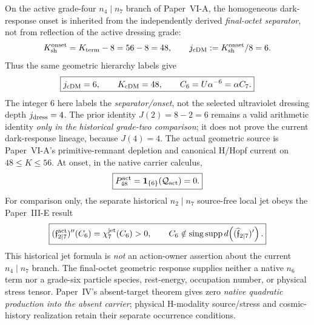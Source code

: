 \documentclass[12pt,a4paper]{article}
\begin{document}
\begin{theorem}[Final-octet \(K=48\) onset and native-carrier desert]
\label{p9:thm:closed-j48-scalaron-abundance-trace}
On the active grade-four \(n_4\mid n_7\) branch of Paper~VI-A, the
homogeneous dark-response onset is inherited from the independently derived
\emph{final-octet separator}, not from reflection of the active dressing grade:
\[
 K_{\rm sh}^{\rm onset}=K_{\rm term}-8=56-8=48,
 \qquad j_{\rm cDM}:=K_{\rm sh}^{\rm onset}/8=6.
\]
Thus the same geometric hierarchy labels give
\begin{equation}
\label{p9:eq:qdm6-kdm48-map}
\boxed{
j_{\rm cDM}=6,\qquad K_{\rm cDM}=48,\qquad
C_6=U\alpha^{-6}=\alpha C_7.}
\end{equation}
The integer \(6\) here labels the \emph{separator/onset}, not the selected
ultraviolet dressing depth \(j_{\rm dress}=4\). The prior identity
\(J(2)=8-2=6\) remains a valid arithmetic identity \emph{only in the
historical grade-two comparison}; it does not prove the current dark-response
lineage, because \(J(4)=4\). The actual geometric source is Paper~VI-A's
primitive-remnant depletion and canonical H/Hopf current on \(48\le K\le56\).
At onset, in the native carrier calculus,
\begin{equation}
 \label{p9:eq:k48-native-carrier-zero}
\boxed{P_{48}^{\rm act}
 =\mathbf1_{\{6\}}(\mathcal Q_{\rm act})=0.}
\end{equation}
For comparison only, the separate historical \(n_2\mid n_7\)
source-free local jet obeys the Paper~III-E result
\begin{equation}
\label{p9:eq:k48-no-action-junction}
 \boxed{(\mathfrak f_{2\mid7}^{\rm act})''(C_6)
 =\chi_7^{\rm jet}(C_6)>0,
 \qquad C_6\notin
 \operatorname{sing\,supp}d\!\left((\widehat{\mathfrak f}_{2\mid7})'\right).}
\end{equation}
This historical jet formula is \emph{not} an action-owner assertion about
the current \(n_4\mid n_7\) branch. The final-octet geometric response
supplies neither a native \(n_6\) term nor a grade-six particle species,
rest-energy, occupation number, or physical stress tensor. Paper~IV's
absent-target theorem gives zero \emph{native quadratic production into the
absent carrier}; physical H-modality source/stress and cosmic-history
realization retain their separate occurrence conditions.
\end{theorem}
\end{document}
